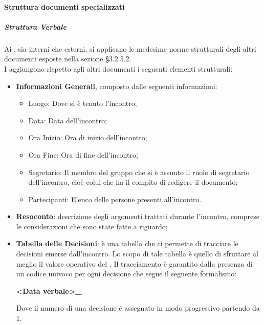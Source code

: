             \paragraph{Struttura documenti specializzati}
                \subparagraph{Struttura Verbale}
                    Ai , sia interni che esterni, si applicano le medesime norme strutturali degli altri documenti esposte nella sezione §3.2.5.2. \\
                    I  aggiungono rispetto agli altri documenti i seguenti elementi strutturali:
                    \begin{itemize}
                        \item\textbf{Informazioni Generali}, composto dalle seguenti informazioni:
                            \begin{itemize}
                                \item Luogo: Dove si è tenuto l’incontro;
                                \item Data: Data dell’incontro;
                                \item Ora Inizio: Ora di inizio dell’incontro;
                                \item Ora Fine: Ora di fine dell’incontro;
                                \item Segretario: Il membro del gruppo che si è assunto il ruolo di segretario dell’incontro, cioè colui che ha il compito di redigere il documento;
                                \item Partecipanti: Elenco delle persone presenti all’incontro.
                            \end{itemize}
                        \item\textbf{Resoconto}: descrizione degli argomenti trattati durante l’incontro, comprese le considerazioni che sono state fatte a riguardo;
                        \item\textbf{Tabella delle Decisioni}: è una tabella che ci permette di tracciare le decisioni emerse dall’incontro. Lo scopo di tale tabella è quello di sfruttare al meglio il valore operativo del . Il tracciamento è garantito dalla presenza di un codice univoco per ogni decisione che segue il seguente formalismo: \\
                            \begin{center}
                                \textbf{<Data verbale>\_<Numero decisione>}
                            \end{center}
                            Dove il numero di una decisione è assegnato in modo progressivo partendo da 1.
                    \end{itemize}
